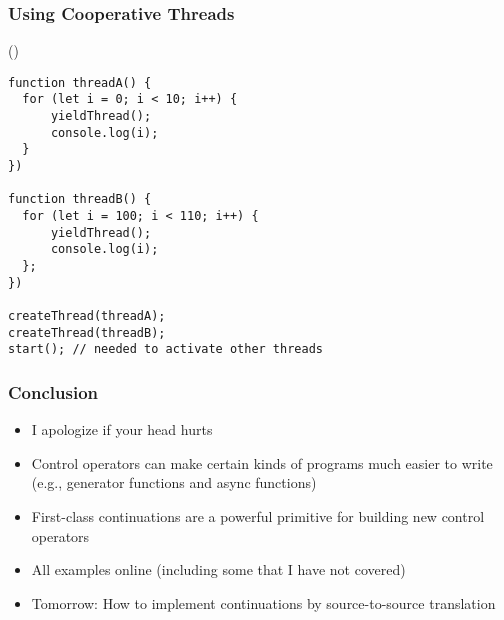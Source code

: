 \documentclass[8pt,pdf,handout]{beamer}
\begin{document}
\begin{frame}[fragile]
\frametitle{Using Cooperative Threads}

()

\begin{lstlisting}
function threadA() {
  for (let i = 0; i < 10; i++) {
      yieldThread();
      console.log(i);
  }
})

function threadB() {
  for (let i = 100; i < 110; i++) {
      yieldThread();
      console.log(i);
  };
})

createThread(threadA);
createThread(threadB);
start(); // needed to activate other threads
\end{lstlisting}
\end{frame}

\begin{frame}
\frametitle{Conclusion}

\begin{itemize}

  \item I apologize if your head hurts

  \item Control operators can make certain kinds of programs much easier to
  write (e.g., generator functions and async functions)

  \item First-class continuations are a powerful primitive for building new
  control operators

  \item All examples online (including some that I have not covered)

  \item Tomorrow: How to implement continuations by source-to-source translation


\end{itemize}

\end{frame}
\end{document}
